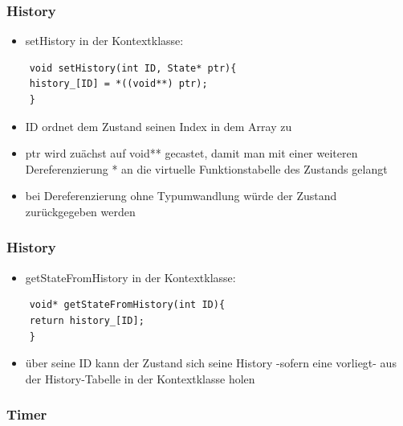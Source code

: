 \documentclass{beamer}
\begin{document}
\begin{frame}[fragile]
	\frametitle{History}
	\begin{itemize}
		\item setHistory in der Kontextklasse:
	\end{itemize}
	\begin{lstlisting}
	void setHistory(int ID, State* ptr){
	history_[ID] = *((void**) ptr);
	}
	\end{lstlisting}
	\begin{itemize}
		\item ID ordnet dem Zustand seinen Index in dem Array zu
		\item ptr wird zu\"achst auf void** gecastet, damit man mit einer weiteren Dereferenzierung * an die virtuelle Funktionstabelle des Zustands gelangt
		\item bei Dereferenzierung ohne Typumwandlung w\"urde der Zustand zur\"uckgegeben werden
	\end{itemize}
\end{frame}

\begin{frame}[fragile]
	\frametitle{History}
	\begin{itemize}
		\item getStateFromHistory in der Kontextklasse:
	\end{itemize}
	\begin{lstlisting}
	void* getStateFromHistory(int ID){
	return history_[ID];
	}
	\end{lstlisting}
	\begin{itemize}
		\item \"uber seine ID kann der Zustand sich seine History -sofern eine vorliegt- aus der History-Tabelle in der Kontextklasse holen
	\end{itemize}
\end{frame}


\begin{frame}
 \frametitle{Timer}
\end{frame}
\end{document}
